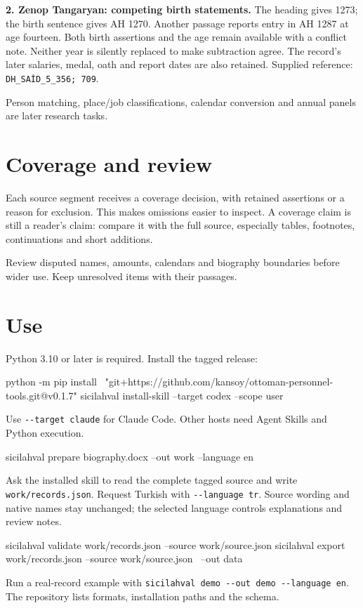 \documentclass[11pt,a4paper]{article}
\begin{document}
\textbf{2. Zenop Tangaryan: competing birth statements.}
The heading gives 1273; the birth sentence gives AH 1270. Another passage reports entry in AH 1287 at age fourteen. Both birth assertions and the age remain available with a conflict note. Neither year is silently replaced to make subtraction agree. The record's later salaries, medal, oath and report dates are also retained. Supplied reference: \texttt{DH\_SAİD\_5\_356; 709}.

Person matching, place/job classifications, calendar conversion and annual panels are later research tasks.

\section{Coverage and review}
Each source segment receives a coverage decision, with retained assertions or a reason for exclusion. This makes omissions easier to inspect. A coverage claim is still a reader's claim: compare it with the full source, especially tables, footnotes, continuations and short additions.

Review disputed names, amounts, calendars and biography boundaries before wider use. Keep unresolved items with their passages.

\newpage
\section{Use}
Python 3.10 or later is required. Install the tagged release:
\begin{Code}
python -m pip install \
  "git+https://github.com/kansoy/ottoman-personnel-tools.git@v0.1.7"
sicilahval install-skill --target codex --scope user
\end{Code}
Use \verb|--target claude| for Claude Code. Other hosts need Agent Skills and Python execution.

\begin{Code}
sicilahval prepare biography.docx --out work --language en
\end{Code}
Ask the installed skill to read the complete tagged source and write \texttt{work/records.json}. Request Turkish with \verb|--language tr|. Source wording and native names stay unchanged; the selected language controls explanations and review notes.

\begin{Code}
sicilahval validate work/records.json --source work/source.json
sicilahval export work/records.json --source work/source.json \
  --out data
\end{Code}
Run a real-record example with \verb|sicilahval demo --out demo --language en|. The repository lists formats, installation paths and the schema.
\end{document}
